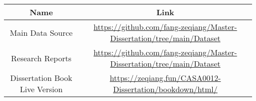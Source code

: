 \documentclass[
  12pt,
  oneside]{book}
\begin{document}
\begin{longtable}[]{@{}cc@{}}
\toprule
\begin{minipage}[b]{0.47\columnwidth}\centering
Name\strut
\end{minipage} & \begin{minipage}[b]{0.47\columnwidth}\centering
Link\strut
\end{minipage}\tabularnewline
\midrule
\endhead
\begin{minipage}[t]{0.47\columnwidth}\centering
Main Data Source\strut
\end{minipage} & \begin{minipage}[t]{0.47\columnwidth}\centering
\url{https://github.com/fang-zeqiang/Master-Dissertation/tree/main/Dataset}\strut
\end{minipage}\tabularnewline
\begin{minipage}[t]{0.47\columnwidth}\centering
Research Reports\strut
\end{minipage} & \begin{minipage}[t]{0.47\columnwidth}\centering
\url{https://github.com/fang-zeqiang/Master-Dissertation/tree/main/Dataset}\strut
\end{minipage}\tabularnewline
\begin{minipage}[t]{0.47\columnwidth}\centering
Dissertation Book Live Version\strut
\end{minipage} & \begin{minipage}[t]{0.47\columnwidth}\centering
\url{https://zeqiang.fun/CASA0012-Dissertation/bookdown/html/}\strut
\end{minipage}\tabularnewline
\bottomrule
\end{longtable}

\enddocument

\printbibliography
\end{document}
